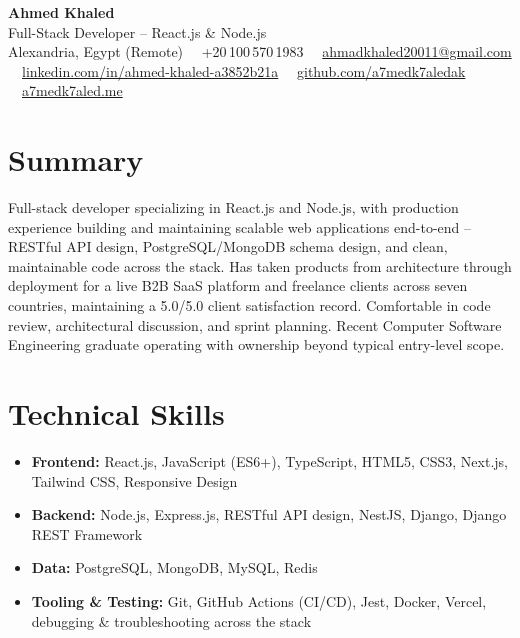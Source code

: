 \documentclass[10pt,letterpaper]{article}
\newcommand{\sectionrule}{\vspace{-1pt}{\color{hairline}\hrule height 0.6pt}\vspace{2pt}}
\begin{document}
\begin{center}
    {\fontsize{20}{22}\selectfont\textbf{Ahmed Khaled}}\\[1pt]
    {\color{accent}\fontsize{10}{11}\selectfont Full-Stack Developer -- React.js \& Node.js}\\[2pt]
    {\footnotesize\color{muted}
      Alexandria, Egypt (Remote) \ \textperiodcentered\ +20\,100\,570\,1983 \ \textperiodcentered\
      \href{mailto:ahmadkhaled20011@gmail.com}{ahmadkhaled20011@gmail.com} \ \textperiodcentered\
      \href{https://www.linkedin.com/in/ahmed-khaled-a3852b21a/}{linkedin.com/in/ahmed-khaled-a3852b21a} \ \textperiodcentered\
      \href{https://github.com/a7medk7aledak}{github.com/a7medk7aledak} \ \textperiodcentered\
      \href{https://a7medk7aled.me}{a7medk7aled.me}
    }
\end{center}

\section*{Summary}
\sectionrule
{\small
Full-stack developer specializing in React.js and Node.js, with production experience building and maintaining
scalable web applications end-to-end -- RESTful API design, PostgreSQL/MongoDB schema design, and clean,
maintainable code across the stack. Has taken products from architecture through deployment for a live B2B SaaS
platform and freelance clients across seven countries, maintaining a 5.0/5.0 client satisfaction record.
Comfortable in code review, architectural discussion, and sprint planning. Recent Computer Software Engineering
graduate operating with ownership beyond typical entry-level scope.
}

\section*{Technical Skills}
\sectionrule
{\small
\begin{itemize}
    \item \textbf{Frontend:} React.js, JavaScript (ES6+), TypeScript, HTML5, CSS3, Next.js, Tailwind CSS, Responsive Design
    \item \textbf{Backend:} Node.js, Express.js, RESTful API design, NestJS, Django, Django REST Framework
    \item \textbf{Data:} PostgreSQL, MongoDB, MySQL, Redis
    \item \textbf{Tooling \& Testing:} Git, GitHub Actions (CI/CD), Jest, Docker, Vercel, debugging \& troubleshooting across the stack
\end{itemize}
}
\end{document}
